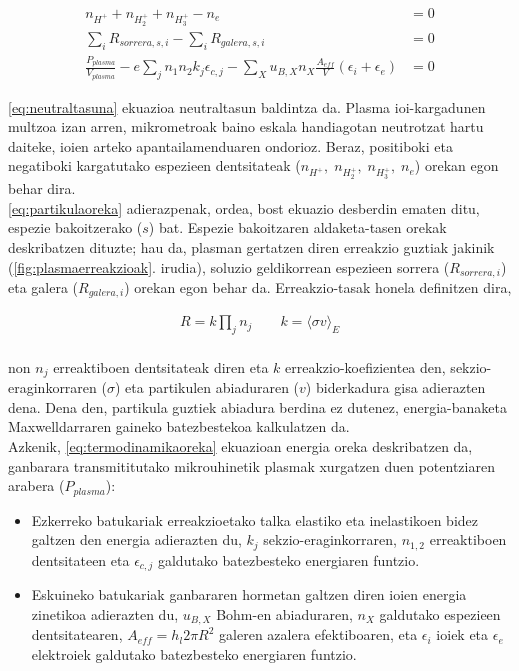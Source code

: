 \documentclass[12pt]{article}
\numberwithin{figure}{section}
\numberwithin{equation}{section}
\begin{document}
\begin{align}
    n_{H^+} + n_{H_2^+} + n_{H_3^+} - n_e &= 0 \label{eq:neutraltasuna}\\
    \sum_{i} R_{sorrera,s,i} - \sum_{i} R_{galera,s,i} &= 0 \label{eq:partikulaoreka}\\
    \frac{P_{plasma}}{V_{plasma}}-e\sum_{j}n_1 n_2 k_j \epsilon_{c,j} - \sum_{X}u_{B,X} n_X \frac{A_{eff}}{V}(\epsilon_i + \epsilon_e) &= 0 \label{eq:termodinamikaoreka}
\end{align}

\eqref{eq:neutraltasuna} ekuazioa neutraltasun baldintza da. Plasma ioi-kargadunen multzoa izan arren, mikrometroak baino eskala handiagotan neutrotzat hartu daiteke, ioien arteko apantailamenduaren ondorioz. Beraz, positiboki eta negatiboki kargatutako espezieen dentsitateak ($n_{H^+},\;n_{H_2^+},\;n_{H_3^+},\;n_e$) orekan egon behar dira.\\

\eqref{eq:partikulaoreka} adierazpenak, ordea, bost ekuazio desberdin ematen ditu, espezie bakoitzerako ($s$) bat. Espezie bakoitzaren aldaketa-tasen orekak deskribatzen dituzte; hau da, plasman gertatzen diren erreakzio guztiak jakinik (\ref{fig:plasmaerreakzioak}. irudia), soluzio geldikorrean espezieen sorrera ($R_{sorrera,i}$) eta galera ($R_{galera,i} $) orekan egon behar da. Erreakzio-tasak honela definitzen dira,

\begin{equation}
\begin{aligned}
    R = k \prod_j n_j \qquad k = \langle \sigma v \rangle_E
\end{aligned}
\label{eq:erreakziotasa}
\end{equation}
\\
non $n_j$ erreaktiboen dentsitateak diren eta $k$ erreakzio-koefizientea den, sekzio-eraginkorraren ($\sigma$) eta partikulen abiaduraren ($v$) biderkadura gisa adierazten dena. Dena den, partikula guztiek abiadura berdina ez dutenez, energia-banaketa Maxwelldarraren gaineko batezbestekoa kalkulatzen da.\\

Azkenik, \eqref{eq:termodinamikaoreka} ekuazioan energia oreka deskribatzen da, ganbarara transmititutako mikrouhinetik plasmak xurgatzen duen potentziaren arabera ($P_{plasma}$):

\begin{itemize}
    \item Ezkerreko batukariak erreakzioetako talka elastiko eta inelastikoen bidez galtzen den energia adierazten du, $k_j$ sekzio-eraginkorraren, $n_{1,2}$ erreaktiboen dentsitateen eta $\epsilon_{c,j}$ galdutako batezbesteko energiaren funtzio. 
    \item Eskuineko batukariak ganbararen hormetan galtzen diren ioien energia zinetikoa adierazten du, $u_{B,X}$ Bohm-en abiaduraren, $n_X$ galdutako espezieen dentsitatearen, $A_{eff} = h_l 2\pi R^2$ galeren azalera efektiboaren, eta $\epsilon_i$ ioiek eta $\epsilon_e$ elektroiek galdutako batezbesteko energiaren funtzio.
\end{itemize}
\end{document}
